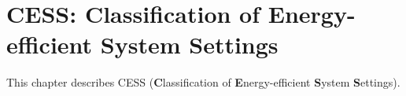 \chapter{CESS: Classification of Energy-efficient System Settings}

This chapter describes CESS (\textbf{C}lassification of \textbf{E}nergy-efficient \textbf{S}ystem \textbf{S}ettings).






